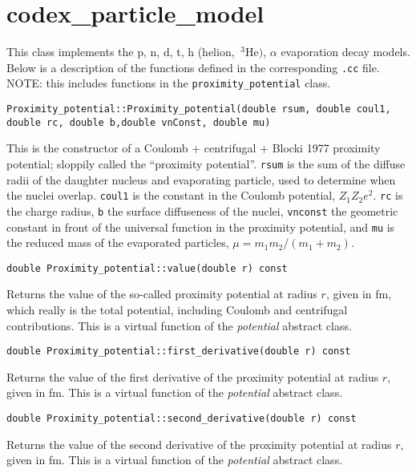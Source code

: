 \lstset{language=C++ ,basicstyle=\footnotesize, breaklines=true, %
}

\section{codex\_particle\_model}
This class implements the p, n, d, t, h (helion, $~^{3}\mathrm{He})$, $\alpha$ evaporation decay models. Below is a description of the functions defined in the corresponding \texttt{.cc} file. NOTE: this includes functions in the \texttt{proximity\_potential} class.

\begin{lstlisting}
Proximity_potential::Proximity_potential(double rsum, double coul1, double rc, double b,double vnConst, double mu)
\end{lstlisting}
This is the constructor of a Coulomb + centrifugal + Blocki 1977 proximity potential; sloppily called the ``proximity potential''. \texttt{rsum} is the sum of the diffuse radii of the daughter nucleus and evaporating particle, used to determine when the nuclei overlap. \texttt{coul1} is the constant in the Coulomb potential, $Z_1 Z_2 e^2$. \texttt{rc} is the charge radius, \texttt{b} the surface diffuseness of the nuclei, \texttt{vnconst} the geometric constant in front of the universal function in the proximity potential, and \texttt{mu} is the reduced mass of the evaporated particles, $\mu = m_1 m_2/(m_1+m_2)$.

\begin{lstlisting}
double Proximity_potential::value(double r) const
\end{lstlisting}
Returns the value of the so-called proximity potential at radius $r$, given in \unit{fm}, which really is the total potential, including Coulomb and centrifugal contributions. This is a virtual function of the \emph{potential} abstract class.

\begin{lstlisting}
double Proximity_potential::first_derivative(double r) const
\end{lstlisting}
Returns the value of the first derivative of the proximity potential at radius $r$, given in \unit{fm}. This is a virtual function of the \emph{potential} abstract class.

\begin{lstlisting}
double Proximity_potential::second_derivative(double r) const
\end{lstlisting}
Returns the value of the second derivative of the proximity potential at radius $r$, given in \unit{fm}. This is a virtual function of the \emph{potential} abstract class.

